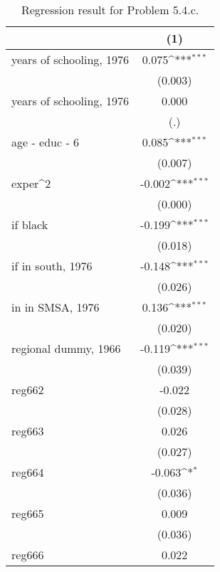 \begin{table}[htbp]\centering
\def\sym#1{\ifmmode^{#1}\else\(^{#1}\)\fi}
\caption{Regression result for Problem 5.4.c.}
\begin{tabular}{l*{1}{c}}
\toprule
                    &\multicolumn{1}{c}{(1)}         \\
\midrule
years of schooling, 1976&       0.075\sym{***}\\
                    &     (0.003)         \\
\addlinespace
years of schooling, 1976&       0.000         \\
                    &         (.)         \\
\addlinespace
age - educ - 6      &       0.085\sym{***}\\
                    &     (0.007)         \\
\addlinespace
exper^2             &      -0.002\sym{***}\\
                    &     (0.000)         \\
\addlinespace
=1 if black         &      -0.199\sym{***}\\
                    &     (0.018)         \\
\addlinespace
=1 if in south, 1976&      -0.148\sym{***}\\
                    &     (0.026)         \\
\addlinespace
=1 in in SMSA, 1976 &       0.136\sym{***}\\
                    &     (0.020)         \\
\addlinespace
regional dummy, 1966&      -0.119\sym{***}\\
                    &     (0.039)         \\
\addlinespace
reg662              &      -0.022         \\
                    &     (0.028)         \\
\addlinespace
reg663              &       0.026         \\
                    &     (0.027)         \\
\addlinespace
reg664              &      -0.063\sym{*}  \\
                    &     (0.036)         \\
\addlinespace
reg665              &       0.009         \\
                    &     (0.036)         \\
\addlinespace
reg666              &       0.022         \\

\end{tabular}
\end{table}
